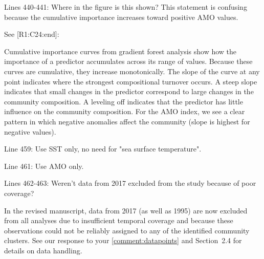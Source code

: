 \documentclass[12pt,english]{reviewresponse}
\begin{document}
\begin{revcomment}
Lines 440-441: Where in the figure is this shown? This statement is confusing because the cumulative importance increases toward positive AMO values.
\end{revcomment}
\begin{revresponse}
See [R1:C24:end]:
	    \begin{changes}
        Cumulative importance curves from gradient forest analysis show how the importance of a predictor accumulates across its range of values. Because these curves are cumulative, they increase monotonically. The slope of the curve at any point indicates where the strongest compositional turnover occurs. A steep slope indicates that small changes in the predictor correspond to large changes in the community composition. A leveling off indicates that the predictor has little influence on the community composition. For the AMO index, we see a clear pattern in which negative anomalies affect the community (slope is highest for negative values).
    \end{changes}
\end{revresponse}


\begin{revcomment}
Line 459: Use SST only, no need for "sea surface temperature".
\end{revcomment}
\begin{revresponse}
\end{revresponse}

\begin{revcomment}
Line 461: Use AMO only.
\end{revcomment}
\begin{revresponse}
\end{revresponse}

\begin{revcomment}
Lines 462-463: Weren't data from 2017 excluded from the study because of poor coverage?
\end{revcomment}
\begin{revresponse}
    In the revised manuscript, data from 2017 (as well as 1995) are now excluded from all analyses due to insufficient temporal coverage and because these observations could not be reliably assigned to any of the identified community clusters. See our response to your \autoref{comment:datapoints} and Section~2.4 for details on data handling.
\end{revresponse}
\end{document}
